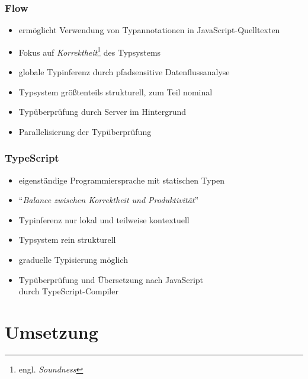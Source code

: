     \begin{frame}
      \frametitle{Flow}
      \begin{itemize}
        \item ermöglicht Verwendung von Typannotationen in JavaScript-Quelltexten
        \item Fokus auf \emph{Korrektheit}\footnote{engl. \textit{Soundness}} des Typsystems
        \item globale Typinferenz durch pfadsensitive Datenflussanalyse
        \item Typsystem größtenteils strukturell, zum Teil nominal
        \item Typüberprüfung durch Server im Hintergrund
        \item Parallelisierung der Typüberprüfung
      \end{itemize}
    \end{frame}

    \begin{frame}
      \frametitle{TypeScript}
      \begin{itemize}
        \item eigenständige Programmiersprache mit statischen Typen
        \item \enquote{\textit{Balance zwischen Korrektheit und Produktivität}}~\autocite{TYPESCRIPT:DESIGN_GOALS}
        \item Typinferenz nur lokal und teilweise kontextuell
        \item Typsystem rein strukturell
        \item graduelle Typisierung möglich
        \item Typüberprüfung und Übersetzung nach JavaScript\\durch TypeScript-Compiler
      \end{itemize}
    \end{frame}

  \section{Umsetzung}

